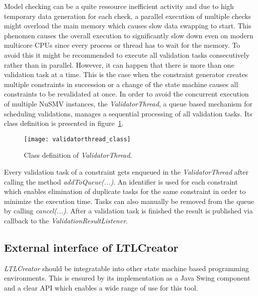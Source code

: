 Model checking can be a quite ressource inefficient activity and due to high temporary data generation for each check, a parallel execution of multiple checks might overload the main memory which causes slow data swapping to start. This phenomen causes the overall execution to significantly slow down even on modern multicore CPUs since every process or thread has to wait for the memory. To avoid this it might be recommended to execute all validation tasks consecutively rather than in parallel.
However, it can happen that there is more than one validation task at a time. This is the case when the constraint generator creates multiple constraints in succession or a change of the state machine causes all constraints to be revalidated at once.
In order to avoid the concurrent execution of multiple NuSMV instances, the \emph{ValidatorThread}, a queue based mechanism for scheduling validations, manages a sequential processing of all validation tasks. Its class definition is presented in figure~\ref{fig:validatorthread_class}.
\begin{figure}[htbp]
  \centering
  \texttt{[image: validatorthread\_class]} 
  \caption{Class definition of \emph{ValidatorThread}.}
  \label{fig:validatorthread_class}
\end{figure}
Every validation task of a constraint gets enqueued in the \emph{ValidatorThread} after calling the method \emph{addToQueue(...)}.
An identifier is used for each constraint which enables elimination of duplicate tasks for the same constraint in order to minimize the execution time. Tasks can also manually be removed from the queue by calling \emph{cancel(...)}. After a validation task is finished the result is published via callback to the \emph{ValidationResultListener}.









\subsection{External interface of LTLCreator}
\label{sec:easeofintegration}

\emph{LTLCreator} should be integratable into other state machine based programming environments. This is ensured by its implementation as a Java Swing component and a clear API which enables a wide range of use for this tool.

